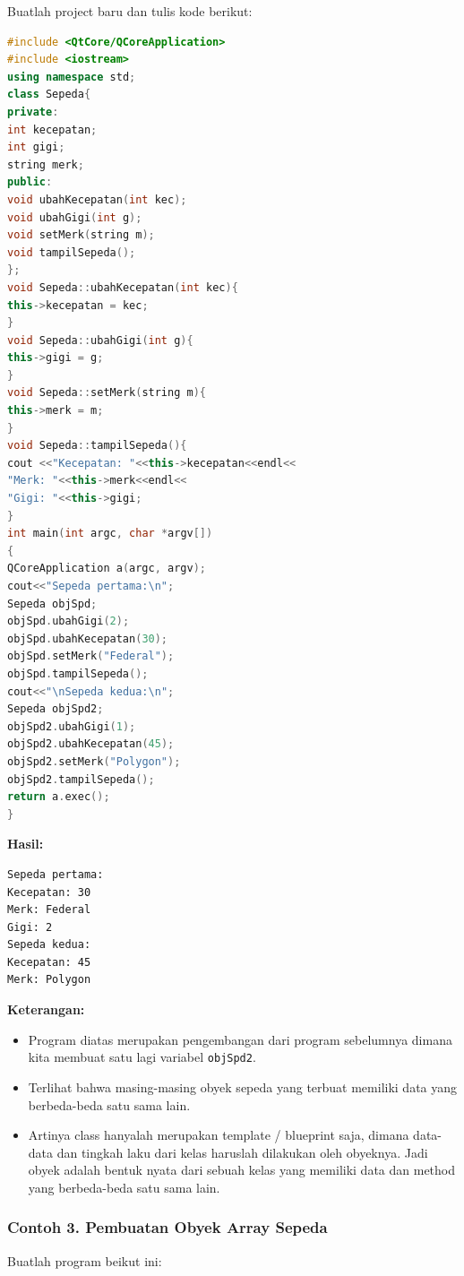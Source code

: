 Buatlah project baru dan tulis kode berikut:

\begin{lstlisting}[language=c++]
#include <QtCore/QCoreApplication>
#include <iostream>
using namespace std;
class Sepeda{
private:
int kecepatan;
int gigi;
string merk;
public:
void ubahKecepatan(int kec);
void ubahGigi(int g);
void setMerk(string m);
void tampilSepeda();
};
void Sepeda::ubahKecepatan(int kec){
this->kecepatan = kec;
}
void Sepeda::ubahGigi(int g){
this->gigi = g;
}
void Sepeda::setMerk(string m){
this->merk = m;
}
void Sepeda::tampilSepeda(){
cout <<"Kecepatan: "<<this->kecepatan<<endl<<
"Merk: "<<this->merk<<endl<<
"Gigi: "<<this->gigi;
}
int main(int argc, char *argv[])
{
QCoreApplication a(argc, argv);
cout<<"Sepeda pertama:\n";
Sepeda objSpd;
objSpd.ubahGigi(2);
objSpd.ubahKecepatan(30);
objSpd.setMerk("Federal");
objSpd.tampilSepeda();
cout<<"\nSepeda kedua:\n";
Sepeda objSpd2;
objSpd2.ubahGigi(1);
objSpd2.ubahKecepatan(45);
objSpd2.setMerk("Polygon");
objSpd2.tampilSepeda();
return a.exec();
}
\end{lstlisting}

\textbf{Hasil:}

\begin{verbatim}
Sepeda pertama:
Kecepatan: 30
Merk: Federal
Gigi: 2
Sepeda kedua:
Kecepatan: 45
Merk: Polygon
\end{verbatim}

\textbf{Keterangan:}

\begin{itemize}
\tightlist
\item
  Program diatas merupakan pengembangan dari program sebelumnya dimana
  kita membuat satu lagi variabel \texttt{objSpd2}.
\item
  Terlihat bahwa masing-masing obyek sepeda yang terbuat memiliki data
  yang berbeda-beda satu sama lain.
\item
  Artinya class hanyalah merupakan template / blueprint saja, dimana
  data-data dan tingkah laku dari kelas haruslah dilakukan oleh
  obyeknya. Jadi obyek adalah bentuk nyata dari sebuah kelas yang
  memiliki data dan method yang berbeda-beda satu sama lain.
\end{itemize}

\subsubsection*{Contoh 3. Pembuatan Obyek Array Sepeda}

Buatlah program beikut ini:

